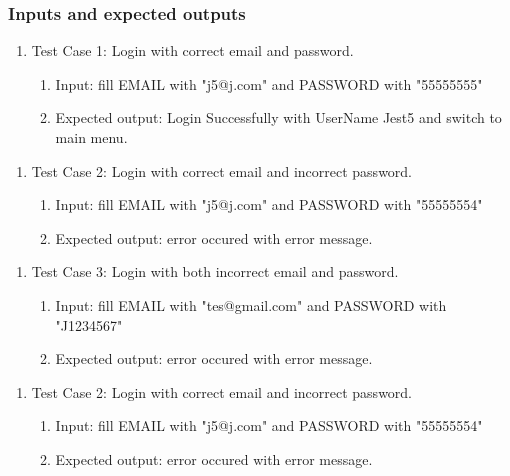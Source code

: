 \documentclass[11pt]{article}
\begin{document}
    \subsubsection*{Inputs and expected outputs}
    \begin{enumerate}
        \item Test Case 1: Login with correct email and password.
        \begin{enumerate}
            \item  Input: fill EMAIL with "j5@j.com" and PASSWORD with "55555555"
            \item  Expected output: Login Successfully with UserName Jest5 and switch to main menu.
        \end{enumerate}
    \end{enumerate}
    \begin{enumerate}
        \item Test Case 2: Login with correct email and incorrect password.
        \begin{enumerate}
            \item  Input: fill EMAIL with "j5@j.com" and PASSWORD with "55555554"
            \item  Expected output: error occured with error message.

        \end{enumerate}
    \end{enumerate}
    \begin{enumerate}
        \item Test Case 3: Login with both incorrect email and password.
        \begin{enumerate}
            \item  Input: fill EMAIL with "tes@gmail.com" and PASSWORD with "J1234567"
            \item Expected output: error occured with error message.
        \end{enumerate}
    \end{enumerate}
    \begin{enumerate}
        \item Test Case 2: Login with correct email and incorrect password.
        \begin{enumerate}
            \item  Input: fill EMAIL with "j5@j.com" and PASSWORD with "55555554"
            \item  Expected output: error occured with error message.

        \end{enumerate}
    \end{enumerate}
\end{document}

